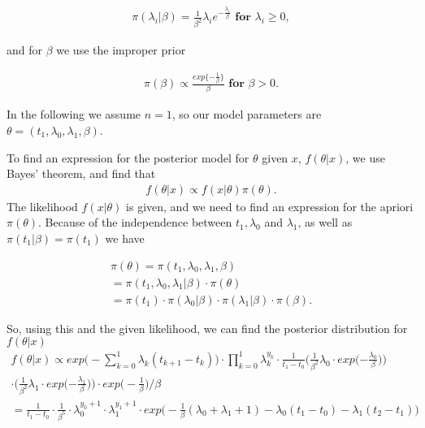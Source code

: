 \begin{align}
    \pi(\lambda_i | \beta) = \frac{1}{\beta^2}\lambda_i e^{-\frac{\lambda_i}{\beta}} \textbf{ for } \lambda_i \geq 0,
\end{align}

and for $\beta$ we use the improper prior 

\begin{align}
    \pi (\beta) \propto \frac{exp\{ -\frac{1}{\beta} \} }{\beta} \textbf{ for } \beta > 0.
\end{align}

In the following we assume $n = 1$, so our model parameters are $\theta = (t_1, \lambda_0, \lambda_1, \beta)$. 

To find an expression for the posterior model for $\theta$ given $x$, $f(\theta|x)$, we use Bayes' theorem, and find that 
\begin{align}
    f(\theta|x) \propto f(x|\theta) \pi(\theta).
\end{align}
The likelihood $f(x | \theta)$ is given, and we need to find an expression for the apriori $\pi(\theta)$. Because of the independence between $t_1, \lambda_0$ and $\lambda_1$, as well as $\pi(t_1|\beta) = \pi(t_1)$ we have

\begin{align}
    \pi(\theta) 
    = \pi(t_1, \lambda_0, \lambda_1, \beta) \nonumber \\
    = \pi(t_1, \lambda_0, \lambda_1 | \beta) \cdot \pi(\theta) \nonumber \\
    = \pi(t_1) \cdot \pi(\lambda_0|\beta) \cdot \pi(\lambda_1|\beta) \cdot \pi(\beta).
\end{align}

So, using this and the given likelihood, we can find the posterior distribution for $f(\theta|x)$
\begin{align} \label{eq:post}
    f(\theta|x) \propto exp \Big( - \sum_{k = 0}^1 \lambda_k (t_{k+1} - t_k) \Big)\cdot \prod_{k = 0}^1 \lambda_k^{y_k} \cdot \frac{1}{t_1-t_0} 
    \Big( \frac{1}{\beta^2} \lambda_0 \cdot
    exp \Big({-\frac{\lambda_0}{\beta}} \Big)  \Big) \nonumber \\ 
    \cdot \Big( \frac{1}{\beta^2} \lambda_1 \cdot exp \Big({-\frac{\lambda_1}{\beta}} \Big) \Big) \cdot exp \Big( -\frac{1}{\beta} \Big)/\beta \nonumber \\
    = \frac{1}{t_1-t_0} \cdot \frac{1}{\beta^5} \cdot \lambda_0^{y_0 + 1} \cdot \lambda_1^{y_1 + 1} \cdot exp \Big( -\frac{1}{\beta}(\lambda_0 + \lambda_1 + 1) - \lambda_0(t_1-t_0) - \lambda_1(t_2-t_1) \Big)
\end{align}



